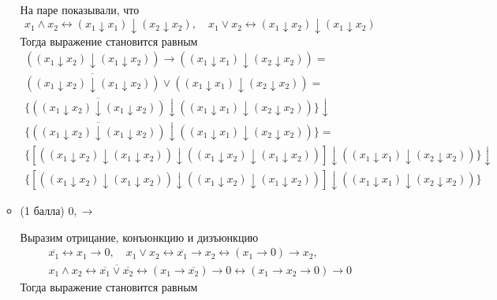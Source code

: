 \begin{enumerate}
\begin{itemize}
    \begin{solution}
      На паре показывали, что
      \begin{equation}
        x_1 \land x_2 \leftrightarrow (x_1 \downarrow x_1) \downarrow (x_2 \downarrow x_2), \quad x_1 \lor x_2 \leftrightarrow (x_1 \downarrow x_2) \downarrow (x_1 \downarrow x_2)
      \end{equation}
      Тогда выражение становится равным
      \begin{eqnarray}
        ((x_1 \downarrow x_2) \downarrow (x_1 \downarrow x_2)) \rightarrow ((x_1 \downarrow x_1) \downarrow (x_2 \downarrow x_2)) = \\
        \overline{((x_1 \downarrow x_2) \downarrow (x_1 \downarrow x_2))} \lor ((x_1 \downarrow x_1) \downarrow (x_2 \downarrow x_2)) = \\
        \{\overline{((x_1 \downarrow x_2) \downarrow (x_1 \downarrow x_2))} \downarrow ((x_1 \downarrow x_1) \downarrow (x_2 \downarrow x_2))\} \downarrow \\ \{\overline{((x_1 \downarrow x_2) \downarrow (x_1 \downarrow x_2))} \downarrow ((x_1 \downarrow x_1) \downarrow (x_2 \downarrow x_2))\} = \\
        \{[((x_1 \downarrow x_2) \downarrow (x_1 \downarrow x_2)) \downarrow ((x_1 \downarrow x_2) \downarrow (x_1 \downarrow x_2))] \downarrow ((x_1 \downarrow x_1) \downarrow (x_2 \downarrow x_2))\} \downarrow \\
        \{[((x_1 \downarrow x_2) \downarrow (x_1 \downarrow x_2)) \downarrow ((x_1 \downarrow x_2) \downarrow (x_1 \downarrow x_2))] \downarrow ((x_1 \downarrow x_1) \downarrow (x_2 \downarrow x_2))\}
      \end{eqnarray}
    \end{solution}
    \item (1 балла) $0, \rightarrow$
    \begin{solution}
      Выразим отрицание, конъюнкцию и дизъюнкцию
      \begin{eqnarray}
        \overline{x_1} \leftrightarrow x_1 \rightarrow 0, \quad x_1 \lor x_2 \leftrightarrow \overline{x_1} \rightarrow x_2 \leftrightarrow (x_1 \rightarrow 0) \rightarrow x_2, \\ x_1 \land x_2 \leftrightarrow \overline{\overline{x_1} \lor \overline{x_2}} \leftrightarrow (x_1 \rightarrow \overline{x_2}) \rightarrow 0 \leftrightarrow (x_1 \rightarrow x_2 \rightarrow 0) \rightarrow 0
      \end{eqnarray}
      Тогда выражение становится равным
      \begin{eqnarray}

\end{eqnarray}
\end{solution}
\end{itemize}
\end{enumerate}
